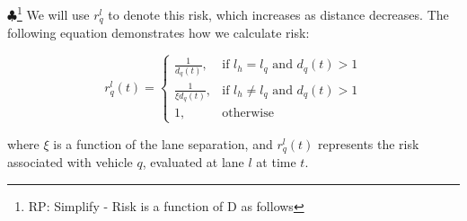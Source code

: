 \documentclass[letterpaper, 10 pt, conference]{ieeeconf}  %
\newcommand\NB[1]{$\spadesuit$\footnote{NB: #1}}
\newcommand\RP[1]{$\clubsuit$\footnote{RP: #1}}
\begin{document}



\RP{Simplify - Risk is a function of D as follows}
We will use $r_q^l$ to denote this risk, which increases as distance decreases. The following equation demonstrates how we calculate risk:

\begin{equation}
    r_{q}^{l}(t) =
    \begin{cases}
    \frac{1}{d_{q}(t)},  & \text{if } l_h=l_q \text{ and } d_{q}(t) > 1  \\
    \frac{1}{\xi d_{q}(t)},  & \text{if } l_h\neq l_q \text{ and } d_{q}(t) > 1  \\
        1,                     & \text{otherwise}  
    \end{cases}
\end{equation}

where $\xi$ is a function of the lane separation, and $r_{q}^{l}(t)$ represents the risk associated with vehicle $q$, evaluated at lane $l$ at time $t$.

\end{document}
